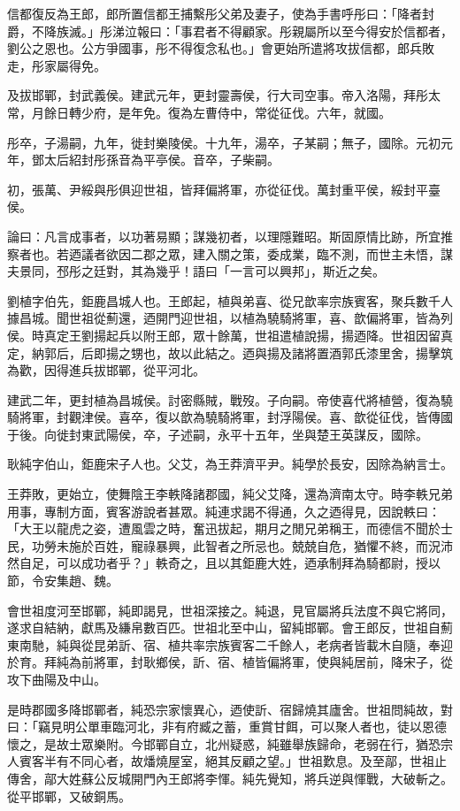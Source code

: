 \begin{pinyinscope}
信都復反為王郎，郎所置信都王捕繫彤父弟及妻子，使為手書呼彤曰：「降者封爵，不降族滅。」彤涕泣報曰：「事君者不得顧家。彤親屬所以至今得安於信都者，劉公之恩也。公方爭國事，彤不得復念私也。」會更始所遣將攻拔信都，郎兵敗走，彤家屬得免。

及拔邯鄲，封武義侯。建武元年，更封靈壽侯，行大司空事。帝入洛陽，拜彤太常，月餘日轉少府，是年免。復為左曹侍中，常從征伐。六年，就國。

彤卒，子湯嗣，九年，徙封樂陵侯。十九年，湯卒，子某嗣；無子，國除。元初元年，鄧太后紹封彤孫音為平亭侯。音卒，子柴嗣。

初，張萬、尹綏與彤俱迎世祖，皆拜偏將軍，亦從征伐。萬封重平侯，綏封平臺侯。

論曰：凡言成事者，以功著易顯；謀幾初者，以理隱難昭。斯固原情比跡，所宜推察者也。若迺議者欲因二郡之眾，建入關之策，委成業，臨不測，而世主未悟，謀夫景同，邳彤之廷對，其為幾乎！語曰「一言可以興邦」，斯近之矣。

劉植字伯先，鉅鹿昌城人也。王郎起，植與弟喜、從兄歆率宗族賓客，聚兵數千人據昌城。聞世祖從薊還，迺開門迎世祖，以植為驍騎將軍，喜、歆偏將軍，皆為列侯。時真定王劉揚起兵以附王郎，眾十餘萬，世祖遣植說揚，揚迺降。世祖因留真定，納郭后，后即揚之甥也，故以此結之。迺與揚及諸將置酒郭氏漆里舍，揚擊筑為歡，因得進兵拔邯鄲，從平河北。

建武二年，更封植為昌城侯。討密縣賊，戰歿。子向嗣。帝使喜代將植營，復為驍騎將軍，封觀津侯。喜卒，復以歆為驍騎將軍，封浮陽侯。喜、歆從征伐，皆傳國于後。向徙封東武陽侯，卒，子述嗣，永平十五年，坐與楚王英謀反，國除。

耿純字伯山，鉅鹿宋子人也。父艾，為王莽濟平尹。純學於長安，因除為納言士。

王莽敗，更始立，使舞陰王李軼降諸郡國，純父艾降，還為濟南太守。時李軼兄弟用事，專制方面，賓客游說者甚眾。純連求謁不得通，久之迺得見，因說軼曰：「大王以龍虎之姿，遭風雲之時，奮迅拔起，期月之閒兄弟稱王，而德信不聞於士民，功勞未施於百姓，寵祿暴興，此智者之所忌也。兢兢自危，猶懼不終，而況沛然自足，可以成功者乎？」軼奇之，且以其鉅鹿大姓，迺承制拜為騎都尉，授以節，令安集趙、魏。

會世祖度河至邯鄲，純即謁見，世祖深接之。純退，見官屬將兵法度不與它將同，遂求自結納，獻馬及縑帛數百匹。世祖北至中山，留純邯鄲。會王郎反，世祖自薊東南馳，純與從昆弟訢、宿、植共率宗族賓客二千餘人，老病者皆載木自隨，奉迎於育。拜純為前將軍，封耿鄉侯，訢、宿、植皆偏將軍，使與純居前，降宋子，從攻下曲陽及中山。

是時郡國多降邯鄲者，純恐宗家懷異心，迺使訢、宿歸燒其廬舍。世祖問純故，對曰：「竊見明公單車臨河北，非有府臧之蓄，重賞甘餌，可以聚人者也，徒以恩德懷之，是故士眾樂附。今邯鄲自立，北州疑惑，純雖舉族歸命，老弱在行，猶恐宗人賓客半有不同心者，故燔燒屋室，絕其反顧之望。」世祖歎息。及至鄗，世祖止傳舍，鄗大姓蘇公反城開門內王郎將李惲。純先覺知，將兵逆與惲戰，大破斬之。從平邯鄲，又破銅馬。


\end{pinyinscope}
